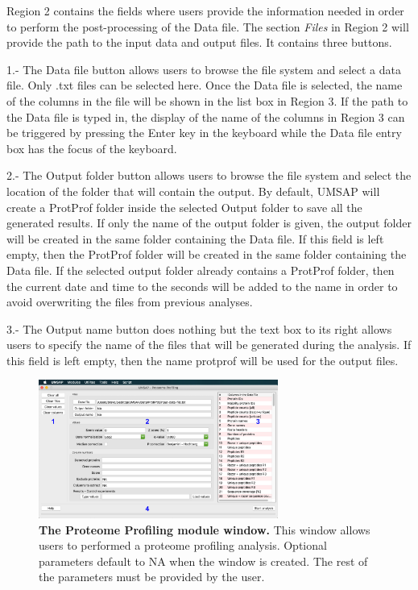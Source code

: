 Region \num{2} contains the fields where users provide the information needed in order to perform the post-processing of the Data file. The section \textit{Files} in Region \num{2} will provide the path to the input data and output files. It contains three buttons. 

\num{1}.- The Data file button allows users to browse the file system and select a data file. Only .txt files can be selected here. Once the Data file is selected, the name of the columns in the file will be shown in the list box in Region \num{3}. If the path to the Data file is typed in, the display of the name of the columns in Region \num{3} can be triggered by pressing the Enter key in the keyboard while the Data file entry box has the focus of the keyboard.

\num{2}.- The Output folder\label{par:protprofOutFolder} button allows users to browse the file system and select the location of the folder that will contain the output. By default, UMSAP will create a ProtProf folder inside the selected Output folder to save all the generated results. If only the name of the output folder is given, the output folder will be created in the same folder containing the Data file. If this field is left empty, then the ProtProf folder will be created in the same folder containing the Data file. If the selected output folder already contains a ProtProf folder, then the current date and time to the seconds will be added to the name in order to avoid overwriting the files from previous analyses.

\num{3}.- The Output name button does nothing but the text box to its right allows users to specify the name of the files that will be generated during the analysis. If this field is left empty, then the name protprof will be used for the output files. 

\begin{figure}[h]
	\centering
	\includegraphics[width=0.7\textwidth]{./IMAGES/MOD-PROTPROF/protprof-mod.jpg}
	\caption[The Proteome Profiling module window]{\textbf{The Proteome Profiling module window.} This window allows users to performed a proteome profiling analysis. Optional parameters default to NA when the window is created. The rest of the parameters must be provided by the user.} 
	\label{fig:protprofMainWindow}
	\vspace{-5pt} 	
\end{figure} 

